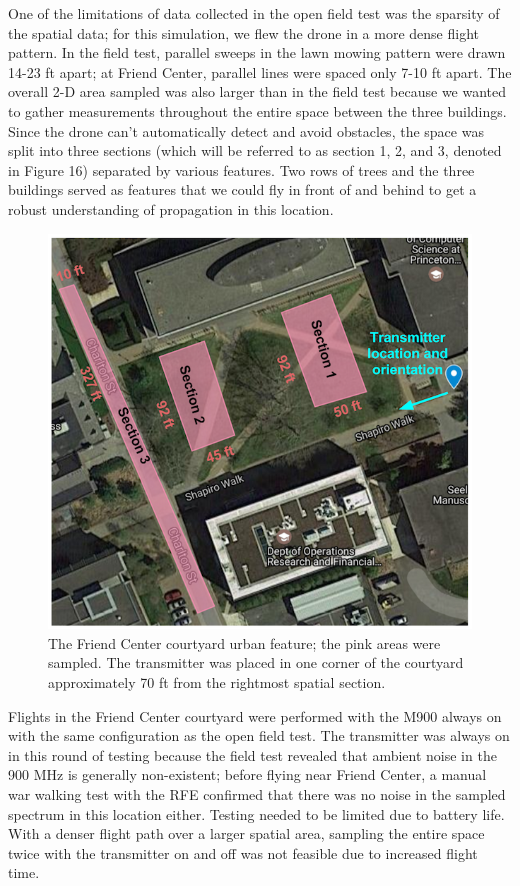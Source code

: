\documentclass[pageno]{jpaper}
\begin{document}
One of the limitations of data collected in the open field test was the sparsity of the spatial data; for this simulation, we flew the drone in a more dense flight pattern. In the field test, parallel sweeps in the lawn mowing pattern were drawn 14-23 ft apart; at Friend Center, parallel lines were spaced only 7-10 ft apart. The overall 2-D area sampled was also larger than in the field test because we wanted to gather measurements throughout the entire space between the three buildings. Since the drone can't automatically detect and avoid obstacles, the space was split into three sections (which will be referred to as section 1, 2, and 3, denoted in Figure 16) separated by various features. Two rows of trees and the three buildings served as features that we could fly in front of and behind to get a robust understanding of propagation in this location.

\begin{figure}
	\caption[Friend Center planning and flight path.]{The Friend Center courtyard urban feature; the pink areas were sampled. The transmitter was placed in one corner of the courtyard approximately 70 ft from the rightmost spatial section.}
	\centerline{\includegraphics{friend_1}}
\end{figure}

Flights in the Friend Center courtyard were performed with the M900 always on with the same configuration as the open field test. The transmitter was always on in this round of testing because the field test revealed that  ambient noise in the 900 MHz is generally non-existent; before flying near Friend Center, a manual war walking test with the RFE confirmed that there was no noise in the sampled spectrum in this location either. Testing needed to be limited due to battery life. With a denser flight path over a larger spatial area, sampling the entire space twice with the transmitter on and off was not feasible due to increased flight time.
\end{document}
